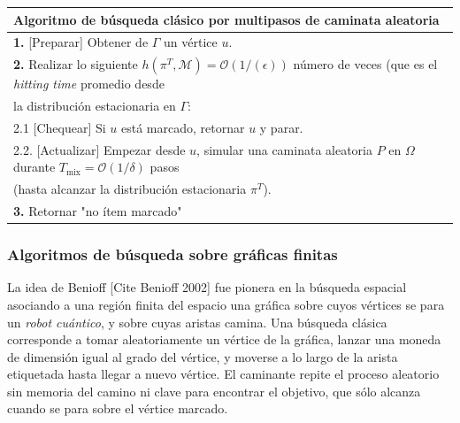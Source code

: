 \begin{center}
    \begin{tabular}{l}
    \hline \textbf{Algoritmo de búsqueda clásico} por multipasos de caminata aleatoria\\\hline 
    \textbf{1.} [Preparar] Obtener de $\Gamma$ un vértice $u$.\\
    \textbf{2.} Realizar lo siguiente $h(\pi^T,\mathcal{M})=\mathcal{O}(1/(\epsilon ))$ número de veces (que es el \textit{hitting time} promedio desde \\la distribución estacionaria en $\Gamma$:\\
    2.1 [Chequear] Si $u$ está marcado, retornar $u$ y  parar.\\
    2.2. [Actualizar] Empezar desde $u$, simular una caminata aleatoria $P$ en $\Omega$ durante $T_{\text{mix}}=\mathcal{O}(1/\delta)$ pasos\\ (hasta alcanzar la distribución estacionaria $\pi^T$).\\
    \textbf{3.} Retornar "no ítem marcado"\\\hline
    \end{tabular}{}
\end{center}{}

\subsubsection{Algoritmos de búsqueda sobre gráficas finitas}
La idea de Benioff [Cite Benioff 2002] fue pionera en la  búsqueda espacial asociando a una región finita del espacio una gráfica sobre cuyos vértices se para un \textit{robot cuántico}, y sobre cuyas aristas camina.
Una búsqueda clásica corresponde a tomar aleatoriamente un vértice de la gráfica, lanzar una moneda de dimensión igual al grado del vértice, y moverse a lo largo de la arista etiquetada hasta llegar a nuevo vértice. El caminante repite el proceso aleatorio sin memoria del camino ni clave para encontrar el objetivo, que sólo alcanza cuando se para sobre el vértice marcado.\\

